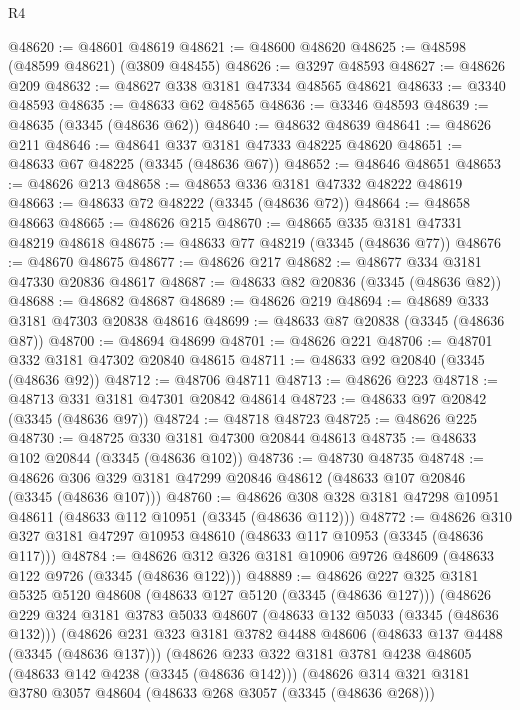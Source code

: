 \begin{lexlean}{R4}
\begin{coremodule}
@48620 := @48601 @48619
@48621 := @48600 @48620
@48625 := @48598 (@48599 @48621) (@3809 @48455)
@48626 := @3297 @48593
@48627 := @48626 @209
@48632 := @48627 @338 @3181 @47334 @48565 @48621
@48633 := @3340 @48593
@48635 := @48633 @62 @48565
@48636 := @3346 @48593
@48639 := @48635 (@3345 (@48636 @62))
@48640 := @48632 @48639
@48641 := @48626 @211
@48646 := @48641 @337 @3181 @47333 @48225 @48620
@48651 := @48633 @67 @48225 (@3345 (@48636 @67))
@48652 := @48646 @48651
@48653 := @48626 @213
@48658 := @48653 @336 @3181 @47332 @48222 @48619
@48663 := @48633 @72 @48222 (@3345 (@48636 @72))
@48664 := @48658 @48663
@48665 := @48626 @215
@48670 := @48665 @335 @3181 @47331 @48219 @48618
@48675 := @48633 @77 @48219 (@3345 (@48636 @77))
@48676 := @48670 @48675
@48677 := @48626 @217
@48682 := @48677 @334 @3181 @47330 @20836 @48617
@48687 := @48633 @82 @20836 (@3345 (@48636 @82))
@48688 := @48682 @48687
@48689 := @48626 @219
@48694 := @48689 @333 @3181 @47303 @20838 @48616
@48699 := @48633 @87 @20838 (@3345 (@48636 @87))
@48700 := @48694 @48699
@48701 := @48626 @221
@48706 := @48701 @332 @3181 @47302 @20840 @48615
@48711 := @48633 @92 @20840 (@3345 (@48636 @92))
@48712 := @48706 @48711
@48713 := @48626 @223
@48718 := @48713 @331 @3181 @47301 @20842 @48614
@48723 := @48633 @97 @20842 (@3345 (@48636 @97))
@48724 := @48718 @48723
@48725 := @48626 @225
@48730 := @48725 @330 @3181 @47300 @20844 @48613
@48735 := @48633 @102 @20844 (@3345 (@48636 @102))
@48736 := @48730 @48735
@48748 := @48626 @306 @329 @3181 @47299 @20846 @48612 (@48633 @107 @20846 (@3345 (@48636 @107)))
@48760 := @48626 @308 @328 @3181 @47298 @10951 @48611 (@48633 @112 @10951 (@3345 (@48636 @112)))
@48772 := @48626 @310 @327 @3181 @47297 @10953 @48610 (@48633 @117 @10953 (@3345 (@48636 @117)))
@48784 := @48626 @312 @326 @3181 @10906 @9726 @48609 (@48633 @122 @9726 (@3345 (@48636 @122)))
@48889 := @48626
    @227
    @325
    @3181
    @5325
    @5120
    @48608
    (@48633 @127 @5120 (@3345 (@48636 @127)))
    (@48626
      @229
      @324
      @3181
      @3783
      @5033
      @48607
      (@48633 @132 @5033 (@3345 (@48636 @132)))
      (@48626
        @231
        @323
        @3181
        @3782
        @4488
        @48606
        (@48633 @137 @4488 (@3345 (@48636 @137)))
        (@48626
          @233
          @322
          @3181
          @3781
          @4238
          @48605
          (@48633 @142 @4238 (@3345 (@48636 @142)))
          (@48626
            @314
            @321
            @3181
            @3780
            @3057
            @48604
            (@48633 @268 @3057 (@3345 (@48636 @268)))

\end{coremodule}
\end{lexlean}
